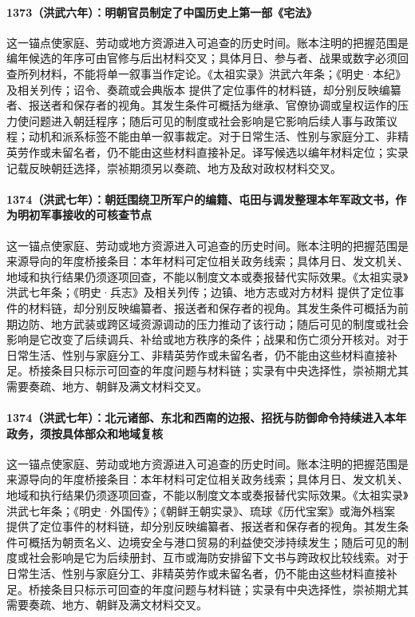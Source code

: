 \paragraph{1373（洪武六年）：明朝官员制定了中国历史上第一部《宅法》} 这一锚点使家庭、劳动或地方资源进入可追查的历史时间。账本注明的把握范围是编年候选的年序可由官修与后出材料交叉；具体月日、参与者、战果或数字必须回查所列材料，不能将单一叙事当作定论。《太祖实录》洪武六年条；《明史·本纪》及相关列传；诏令、奏疏或会典版本 提供了定位事件的材料链，却分别反映编纂者、报送者和保存者的视角。其发生条件可概括为继承、官僚协调或皇权运作的压力使问题进入朝廷程序；随后可见的制度或社会影响是它影响后续人事与政策议程；动机和派系标签不能由单一叙事裁定。对于日常生活、性别与家庭分工、非精英劳作或未留名者，仍不能由这些材料直接补足。译写候选以编年材料定位；实录记载反映朝廷选择，崇祯期须另以奏疏、地方及敌对政权材料交叉。

\paragraph{1374（洪武七年）：朝廷围绕卫所军户的编籍、屯田与调发整理本年军政文书，作为明初军事接收的可核查节点} 这一锚点使家庭、劳动或地方资源进入可追查的历史时间。账本注明的把握范围是来源导向的年度桥接条目：本年材料可定位相关政务线索；具体月日、发文机关、地域和执行结果仍须逐项回查，不能以制度文本或奏报替代实际效果。《太祖实录》洪武七年条；《明史·兵志》及相关列传；边镇、地方志或对方材料 提供了定位事件的材料链，却分别反映编纂者、报送者和保存者的视角。其发生条件可概括为前期边防、地方武装或跨区域资源调动的压力推动了该行动；随后可见的制度或社会影响是它改变了后续调兵、补给或地方秩序的条件；战果和伤亡须分开核对。对于日常生活、性别与家庭分工、非精英劳作或未留名者，仍不能由这些材料直接补足。桥接条目只标示可回查的年度问题与材料链；实录有中央选择性，崇祯期尤其需要奏疏、地方、朝鲜及满文材料交叉。

\paragraph{1374（洪武七年）：北元诸部、东北和西南的边报、招抚与防御命令持续进入本年政务，须按具体部众和地域复核} 这一锚点使家庭、劳动或地方资源进入可追查的历史时间。账本注明的把握范围是来源导向的年度桥接条目：本年材料可定位相关政务线索；具体月日、发文机关、地域和执行结果仍须逐项回查，不能以制度文本或奏报替代实际效果。《太祖实录》洪武七年条；《明史·外国传》；《朝鲜王朝实录》、琉球《历代宝案》或海外档案 提供了定位事件的材料链，却分别反映编纂者、报送者和保存者的视角。其发生条件可概括为朝贡名义、边境安全与港口贸易的利益使交涉持续发生；随后可见的制度或社会影响是它为后续册封、互市或海防安排留下文书与跨政权比较线索。对于日常生活、性别与家庭分工、非精英劳作或未留名者，仍不能由这些材料直接补足。桥接条目只标示可回查的年度问题与材料链；实录有中央选择性，崇祯期尤其需要奏疏、地方、朝鲜及满文材料交叉。

